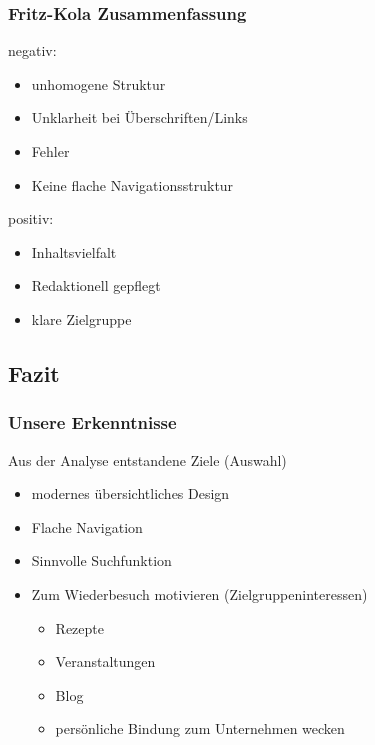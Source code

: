 \begin{frame}
	\frametitle{Fritz-Kola Zusammenfassung}
	negativ:
	\begin{itemize}
		\item unhomogene Struktur
		\item Unklarheit bei Überschriften/Links
		\item Fehler
		\item Keine flache Navigationsstruktur
	\end{itemize}
	
	positiv:
	\begin{itemize}
		\item Inhaltsvielfalt
		\item Redaktionell gepflegt
		\item klare Zielgruppe
	\end{itemize}
\end{frame}

\subsection{Fazit}
\begin{frame}
	\frametitle{Unsere Erkenntnisse}
	Aus der Analyse entstandene Ziele (Auswahl)
	\begin{itemize}
		\item modernes übersichtliches Design %
		\item Flache Navigation
		\item Sinnvolle Suchfunktion %
		\item Zum Wiederbesuch motivieren (Zielgruppeninteressen)
			\begin{itemize}
				\item Rezepte
				\item Veranstaltungen
				\item Blog
				\item persönliche Bindung zum Unternehmen wecken
			\end{itemize}
	\end{itemize}
\end{frame}

